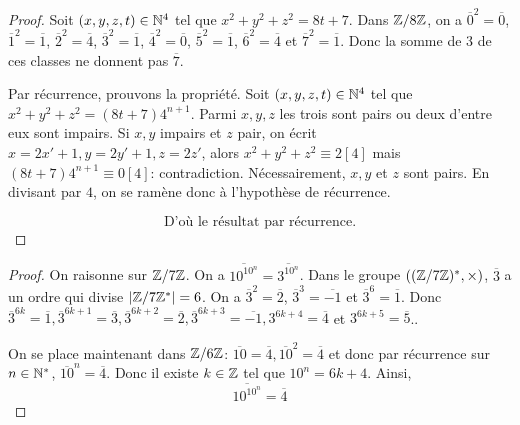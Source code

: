 \documentclass[12pt]{article}
\begin{document}
\begin{proof}
	Soit $(x,y,z,t)\in\mathbb{N}^{4}$ tel que $x^{2}+y^{2}+z^{2}=8t+7$. Dans $\mathbb{Z}/8\mathbb{Z}$, on a $\overline{0}^{2}=\overline{0}$, $\overline{1}^{2}=\overline{1}$, $\overline{2}^{2}=\overline{4}$, $\overline{3}^{2}=\overline{1}$, $\overline{4}^{2}=\overline{0}$, $\overline{5}^{2}=\overline{1}$, $\overline{6}^{2}=\overline{4}$ et $\overline{7}^{2}=\overline{1}$. Donc la somme de 3 de ces classes ne donnent pas $\overline{7}$.

	Par récurrence, prouvons la propriété. Soit $(x,y,z,t)\in\mathbb{N}^{4}$ tel que $x^{2}+y^{2}+z^{2}=(8t+7)4^{n+1}$. Parmi $x,y,z$ les trois sont pairs ou deux d'entre eux sont impairs. Si $x,y$ impairs et $z$ pair, on écrit $x=2x'+1,y=2y'+1,z=2z'$, alors $x^{2}+y^{2}+z^{2}\equiv 2[4]$ mais $(8t+7)4^{n+1}\equiv 0[4]$: contradiction. Nécessairement, $x,y$ et $z$ sont pairs. En divisant par $4$, on se ramène donc à l'hypothèse de récurrence.

	\begin{equation}
		\boxed{\text{D'où le résultat par récurrence.}}
	\end{equation}
\end{proof}

\begin{proof}
	On raisonne sur $\mathbb{Z}/7\mathbb{Z}$. On a $\overline{10^{10^{n}}}=\overline{3^{10^{n}}}$. Dans le groupe $((\mathbb{Z}/7\mathbb{Z})^{*},\times)$, $\overline{3}$ a un ordre qui divise $\vert \mathbb{Z}/7\mathbb{Z}^{*}\vert=6$. On a $\overline{3}^{2}=\overline{2}$, $\overline{3}^{3}=\overline{-1}$ et $\overline{3}^{6}=\overline{1}$. Donc $\overline{3}^{6k}=\overline{1}, \overline{3}^{6k+1}=\overline{3},\overline{3}^{6k+2}=\overline{2},\overline{3}^{6k+3}=\overline{-1}, 3^{6k+4}=\overline{4}$ et $3^{6k+5}=\overline{5}$..

	On se place maintenant dans $\mathbb{Z}/6\mathbb{Z}$: $\overline{10}=\overline{4},\overline{10}^{2}=\overline{4}$ et donc par récurrence sur $n\in\mathbb{N}^{*}$, $\overline{10}^{n}=\overline{4}$. Donc il existe $k\in\mathbb{Z}$ tel que $10^{n}=6k+4$. Ainsi, \begin{equation}
		\boxed{\overline{10^{10^{n}}}=\overline{4}}
	\end{equation}
\end{proof}
\end{document}
